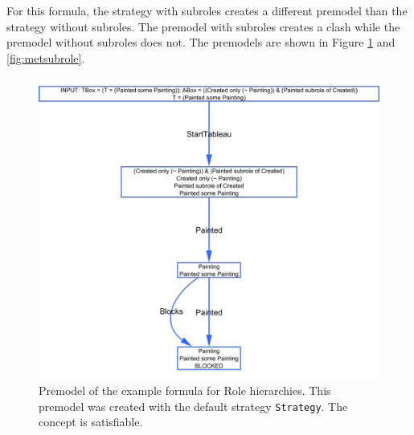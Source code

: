 \documentclass[11pt]{article} %
\begin{document}
For this formula, the strategy with subroles creates a different premodel than the strategy without subroles. The premodel with subroles creates a clash while the premodel without subroles does not. The premodels are shown in Figure \ref{fig:zondersubrole} and \ref{fig:metsubrole}.



\begin{figure}
\begin{center}
\includegraphics[scale=0.4]{premodelzondersubrole}
\caption{Premodel of the example formula for Role hierarchies. This premodel was created with the default strategy \texttt{Strategy}. The concept is satisfiable.}
\label{fig:zondersubrole}
\end{center}
\end{figure}
\end{document}
